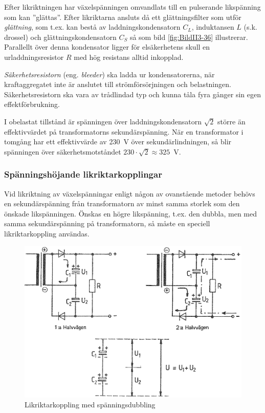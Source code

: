 Efter likriktningen har växelspänningen omvandlats till en pulserande
likspänning som kan ''glättas''.
Efter likriktarna ansluts då ett glättningsfilter som utför \emph{glättning},
som t.ex. kan bestå av laddningskondensatorn \(C_L\), induktansen \(L\) (s.k.
drossel) och glättningskondensatorn \(C_S\) så som bild \ref{fig:BildII3-36}
illustrerar.
Parallellt över denna kondensator ligger för elsäkerhetens skull en
urladdningsresistor \(R\) med hög resistans alltid inkopplad.

\emph{Säkerhetsresistorn}  (eng. \emph{bleeder}) ska ladda ur kondensatorerna,
när kraftaggregatet inte är anslutet till strömförsörjningen och belastningen.
Säkerhetsresistorn ska vara av trådlindad typ och kunna tåla fyra gånger sin
egen effektförbrukning.

I obelastat tillstånd är spänningen över laddningskondensatorn \(\sqrt{2}\)
större än effektivvärdet på transformatorns sekundärspänning.
När en transformator i tomgång har ett effektivvärde av 230~V över
sekundärlindningen, så blir spänningen över säkerhetsmotståndet
\(230\cdot\sqrt{2} \approx 325\)~V.

\subsubsection{Spänningshöjande likriktarkopplingar}

Vid likriktning av växelspänningar enligt någon av ovanstående metoder behövs
en sekundärspänning från transformatorn av minst samma storlek som den önskade
likspänningen.
Önskas en högre likspänning, t.ex. den dubbla, men med samma sekundärspänning
på transformatorn, så måste en speciell likriktarkoppling användas.

\begin{figure}
\includegraphics[width=\textwidth]{images/cropped_pdfs/bild_2_3-37.pdf}
\caption{Likriktarkoppling med spänningsdubbling}
\label{fig:BildII3-37}
\end{figure}

